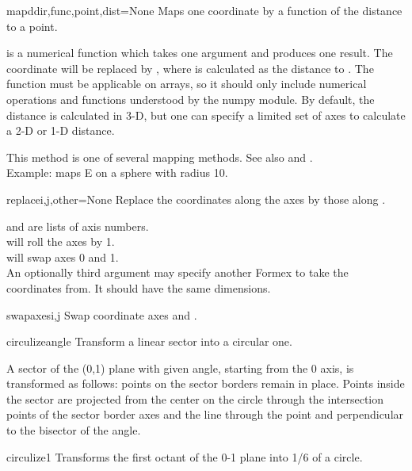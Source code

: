 {{\begin{methoddesc}{mapd}{dir,func,point,dist=None}
Maps one coordinate by a function of the distance to a point.

 is a numerical function which takes one argument and produces one result. The coordinate  will be replaced by , where  is calculated as the distance to . The function must be applicable on arrays, so it should only include numerical operations and functions understood by the numpy module. By default, the distance  is calculated in 3-D, but one can specify a limited set of axes to calculate a 2-D or 1-D distance.

This method is one of several mapping methods. See also  and .\\
Example:  maps E on a sphere with radius 10.
\end{methoddesc}

\begin{methoddesc}{replace}{i,j,other=None}
Replace the coordinates along the axes  by those along .

 and  are lists of axis numbers.\\
 will roll the axes by 1.\\
 will swap axes 0 and 1.\\
An optionally third argument may specify another Formex to take the coordinates from. It should have the same dimensions.
\end{methoddesc}

\begin{methoddesc}{swapaxes}{i,j}
Swap coordinate axes  and .
\end{methoddesc}

\begin{methoddesc}{circulize}{angle}
Transform a linear sector into a circular one.

A sector of the (0,1) plane with given angle, starting from the 0 axis,
is transformed as follows: points on the sector borders remain in
place. Points inside the sector are projected from the center on the
circle through the intersection points of the sector border axes and
the line through the point and perpendicular to the bisector of the
angle.
\end{methoddesc}

\begin{methoddesc}{circulize1}{}
Transforms the first octant of the 0-1 plane into 1/6 of a circle.


\end{methoddesc}}}
